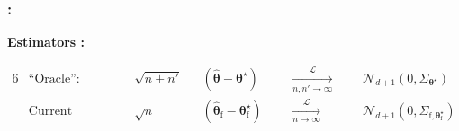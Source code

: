 \documentclass[english,xcolor={rgb,dvipsnames,table,usenames}]{beamer}
\newcommand{\f}{\text{f}}
\begin{document}
\begin{frame}
\frametitle{\secname : \subsecname}
\textbf{Estimators :}

\hspace*{-0.2cm}\begin{alignat*}{6}
& \text{``Oracle'':} & \sqrt[]{n+n'} && ( \hat{\bm{\theta}} - \bm{\theta}^\star ) &&& \xrightarrow[n,n' \to \infty]{\mathcal{L}} &&& \mathcal{N}_{d+1} (0,{\Sigma}_{\bm{\theta}^\star}) \\
& \text{Current methodology:} & \sqrt[]{n} && ( \hat{\bm{\theta}}_{\f} - \bm{\theta}^\star_{\f} ) &&& \xrightarrow[n \to \infty]{\mathcal{L}} &&& \mathcal{N}_{d+1} (0,{\Sigma}_{\f,\bm{\theta}^\star_{\f}})
\end{alignat*}

%

\end{frame}
\end{document}
